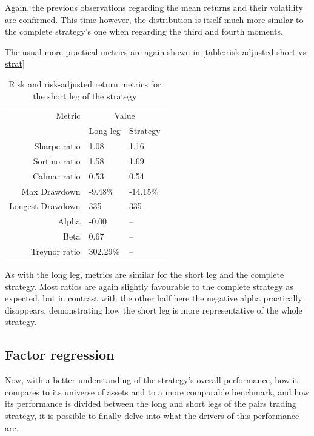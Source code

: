 Again, the previous observations regarding the mean returns and their volatility are confirmed. This time however, the distribution is itself much more similar to the complete strategy's one when regarding the third and fourth moments. 

The usual more practical metrics are again shown in \autoref{table:risk-adjusted-short-vs-strat}

\begin{table}[ht]
    \centering
    \begin{tabular}{rll}
        \toprule
        Metric & \multicolumn{2}{c}{Value} \\ 
        \cmidrule(lr){2-3}
            & Long leg & Strategy \\
        \midrule
        Sharpe ratio & 1.08 & 1.16 \\
        Sortino ratio & 1.58 & 1.69 \\
        Calmar ratio & 0.53 & 0.54 \\
        Max Drawdown & -9.48\% & -14.15\% \\
        Longest Drawdown & 335 & 335 \\
        Alpha & -0.00 & -- \\
        Beta & 0.67 & -- \\
        Treynor ratio & 302.29\% & -- \\
        \bottomrule
    \end{tabular}
    \caption{Risk and risk-adjusted return metrics for the short leg of the strategy}
    \label{table:risk-adjusted-short-vs-strat}
\end{table}

As with the long leg, metrics are similar for the short leg and the complete strategy. Most ratios are again slightly favourable to the complete strategy as expected, but in contrast with the other half here the negative alpha practically disappears, demonstrating how the short leg is more representative of the whole strategy. 


\subsection{Factor regression}
Now, with a better understanding of the strategy's overall performance, how it compares to its universe of assets and to a more comparable benchmark, and how its performance is divided between the long and short legs of the pairs trading strategy, it is possible to finally delve into what the drivers of this performance are. 

